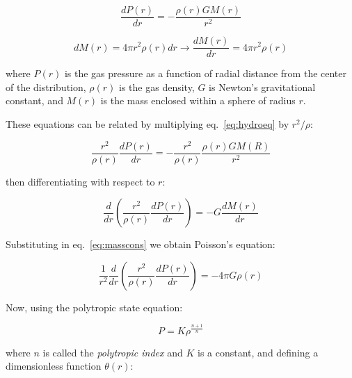 \documentclass{article}
\begin{document}
            \begin{equation}
                \label{eq:hydroeq}
                \frac{dP(r)}{dr} = -\frac{\rho(r)GM(r)}{r^2}
            \end{equation}

            \begin{equation}
                \label{eq:masscons}
                dM(r)=4\pi r^2\rho(r)dr \rightarrow \frac{dM(r)}{dr} = 4\pi r^2\rho(r)
            \end{equation}

            where \(P(r)\) is the gas pressure as a function of radial distance
            from the center of the distribution, \(\rho(r)\) is the gas density,
            \(G\) is Newton's gravitational constant, and \(M(r)\) is the mass
            enclosed within a sphere of radius \(r\).

            These equations can be related by multiplying eq.~\ref{eq:hydroeq}
            by \(r^2/\rho\):

            \[ \frac{r^2}{\rho(r)}\frac{dP(r)}{dr} = -\frac{r^2}{\rho(r)}
            \frac{\rho(r)GM(R)}{r^2} \]

            then differentiating with respect to \(r\):
            
            \[
            \frac{d}{dr}\left(\frac{r^2}{\rho(r)}\frac{dP(r)}{dr}\right)=-G\frac{dM(r)}{dr}
            \]

            Substituting in eq.~\ref{eq:masscons} we obtain Poisson's equation:

            \begin{equation}
                \frac{1}{r^2} \frac{d}{dr} \left( \frac{r^2}{\rho(r)}\frac{dP(r)}{dr} \right) = -4 \pi G\rho(r)
            \end{equation}

            Now, using the polytropic state equation:

            \begin{equation}
                \label{eq:polytropstate}
                    P=K\rho^{\frac{n+1}{n}}
            \end{equation}

            where \(n\) is called the \textit{polytropic index} and \(K\) is a
            constant, and defining a dimensionless function \(\theta(r)\):
\end{document}
